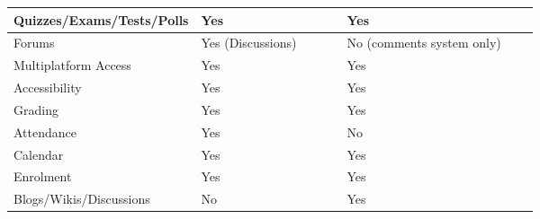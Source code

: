 \begin{table}[ht]
{\begin{tabular}{llllllll}
    \multicolumn{1}{|l|}{Quizzes/Exams/Tests/Polls}   & \multicolumn{1}{l|}{Yes} & \multicolumn{1}{l|}{} & \multicolumn{1}{l|}{} & \multicolumn{1}{l|}{} & \multicolumn{1}{l|}{Yes}                       & \multicolumn{1}{l|}{} & \multicolumn{1}{l|}{} \\ \hline
    \multicolumn{1}{|l|}{Forums}                      & \multicolumn{1}{l|}{Yes (Discussions)} & \multicolumn{1}{l|}{} & \multicolumn{1}{l|}{} & \multicolumn{1}{l|}{} & \multicolumn{1}{l|}{No (comments system only)} & \multicolumn{1}{l|}{} & \multicolumn{1}{l|}{} \\ \hline
    \multicolumn{1}{|l|}{Multiplatform Access}        & \multicolumn{1}{l|}{Yes} & \multicolumn{1}{l|}{} & \multicolumn{1}{l|}{} & \multicolumn{1}{l|}{} & \multicolumn{1}{l|}{Yes}                       & \multicolumn{1}{l|}{} & \multicolumn{1}{l|}{} \\ \hline
    \multicolumn{1}{|l|}{Accessibility}               & \multicolumn{1}{l|}{Yes} & \multicolumn{1}{l|}{} & \multicolumn{1}{l|}{} & \multicolumn{1}{l|}{} & \multicolumn{1}{l|}{Yes}                       & \multicolumn{1}{l|}{} & \multicolumn{1}{l|}{} \\ \hline
    \multicolumn{1}{|l|}{Grading}                     & \multicolumn{1}{l|}{Yes} & \multicolumn{1}{l|}{} & \multicolumn{1}{l|}{} & \multicolumn{1}{l|}{} & \multicolumn{1}{l|}{Yes}                       & \multicolumn{1}{l|}{} & \multicolumn{1}{l|}{} \\ \hline
    \multicolumn{1}{|l|}{Attendance}                  & \multicolumn{1}{l|}{Yes} & \multicolumn{1}{l|}{} & \multicolumn{1}{l|}{} & \multicolumn{1}{l|}{} & \multicolumn{1}{l|}{No}                        & \multicolumn{1}{l|}{} & \multicolumn{1}{l|}{} \\ \hline
    \multicolumn{1}{|l|}{Calendar}                    & \multicolumn{1}{l|}{Yes} & \multicolumn{1}{l|}{} & \multicolumn{1}{l|}{} & \multicolumn{1}{l|}{} & \multicolumn{1}{l|}{Yes}                       & \multicolumn{1}{l|}{} & \multicolumn{1}{l|}{} \\ \hline
    \multicolumn{1}{|l|}{Enrolment}                   & \multicolumn{1}{l|}{Yes} & \multicolumn{1}{l|}{} & \multicolumn{1}{l|}{} & \multicolumn{1}{l|}{} & \multicolumn{1}{l|}{Yes}                       & \multicolumn{1}{l|}{} & \multicolumn{1}{l|}{} \\ \hline
    \multicolumn{1}{|l|}{Blogs/Wikis/Discussions}     & \multicolumn{1}{l|}{No} & \multicolumn{1}{l|}{} & \multicolumn{1}{l|}{} & \multicolumn{1}{l|}{} & \multicolumn{1}{l|}{Yes}                       & \multicolumn{1}{l|}{} & \multicolumn{1}{l|}{} \\ \hline

\end{tabular}}
\end{table}
